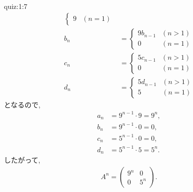 \begin{answerof}{quiz:1:7}
\begin{align*}
\begin{cases}
      9&(n=1)
    \end{cases}\\
    b_n&=
    \begin{cases}
      9b_{n-1}&(n>1)\\
      0&(n=1)
    \end{cases}\\
    c_n&=
    \begin{cases}
      5c_{n-1}&(n>1)\\
      0&(n=1)
    \end{cases}\\
    d_n&=
    \begin{cases}
      5d_{n-1}&(n>1)\\
      5&(n=1)
    \end{cases}
  \end{align*}
  となるので,
  \begin{align*}
    a_n&=9^{n-1}\cdot 9=9^n,\\
    b_n&=9^{n-1}\cdot 0=0,\\
    c_n&=5^{n-1}\cdot 0=0,\\
    d_n&=5^{n-1}\cdot 5=5^n.
  \end{align*}
  したがって,
  \begin{align*}
    A^n=\begin{pmatrix}9^n&0\\0&5^n\end{pmatrix}.
  \end{align*}


\end{answerof}
